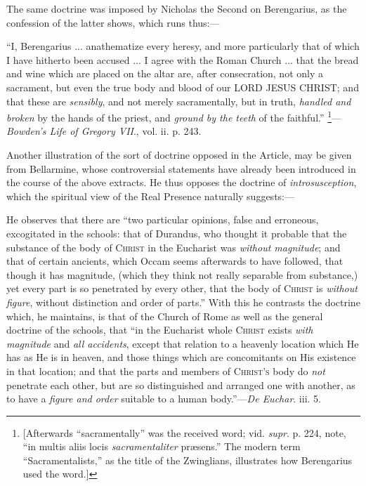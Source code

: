 The same doctrine was imposed by Nicholas the Second on Berengarius,
as the confession of the latter shows, which runs thus:—

``I, Berengarius ... anathematize every heresy,
and more particularly that of which I have hitherto been accused ... I
agree with the Roman Church ... that the bread and wine which are
placed on the altar are, after consecration, not only a sacrament, but
even the true body and blood of our LORD
JESUS CHRIST;
and that these are \emph{sensibly}, and not merely sacramentally, but
in truth, \emph{handled and broken} by the hands of the priest, and \emph{ground by the teeth} of the faithful.'' \footnote{[Afterwards ``sacramentally'' was
the received word; vid. \emph{supr}. p. 224, note, ``in multis
aliis locis \emph{sacramentaliter} præsens.'' The modern term
``Sacramentalists,'' as the title of the Zwinglians,
illustrates how Berengarius used the word.]}—\emph{Bowden's Life of Gregory VII}., vol. ii. p. 243.

Another illustration of the sort of doctrine opposed in the
Article, may be given from Bellarmine, whose controversial statements
have already been introduced in the course of the above extracts. He
thus opposes the doctrine of \emph{introsusception}, which the
spiritual view of the Real Presence naturally suggests:—

He observes that there are ``two particular opinions, false and
erroneous, excogitated in the schools: that of Durandus, who thought
it probable that the substance of the body of C\textsc{hrist}
in the Eucharist was \emph{without magnitude}; and that of certain
ancients, which Occam seems afterwards to have followed, that though
it has magnitude, (which they think not really separable from
substance,) yet every part is so penetrated by every other, that the
body of C\textsc{hrist} is \emph{without figure},
without distinction and order of parts.'' With this he contrasts
the doctrine which, he maintains, is that of the Church of Rome as
well as the general doctrine of the schools, that ``in the
Eucharist whole C\textsc{hrist} exists \emph{with magnitude}
and \emph{all accidents}, except that relation to a heavenly location
which He has as He is in heaven, and those things which are
concomitants on His existence in that location; and that the parts and
members of C\textsc{hrist's} body do \emph{not} penetrate
each other, but are so distinguished and arranged one with another, as
to have a \emph{figure and order} suitable to a human body.''—\emph{De
Euchar}. iii. 5.

